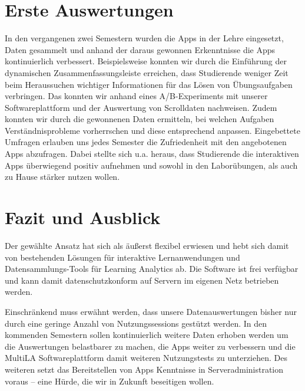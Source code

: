 \documentclass[a0,portrait]{a0poster}
\begin{document}
\begin{multicols}{2}


\section*{Erste Auswertungen}

In den vergangenen zwei Semestern wurden die Apps in der Lehre eingesetzt, Daten gesammelt und anhand der daraus gewonnen Erkenntnisse die Apps kontinuierlich verbessert. Beispielsweise konnten wir durch die Einführung der dynamischen Zusammenfassungsleiste erreichen, dass Studierende weniger Zeit beim Heraussuchen wichtiger Informationen für das Lösen von Übungsaufgaben verbringen. Das konnten wir anhand eines A/B-Experiments mit unserer Softwareplattform und der Auswertung von Scrolldaten nachweisen. Zudem konnten wir durch die gewonnenen Daten ermitteln, bei welchen Aufgaben Verständnisprobleme vorherrschen und diese entsprechend anpassen. Eingebettete Umfragen erlauben uns jedes Semester die Zufriedenheit mit den angebotenen Apps abzufragen. Dabei stellte sich u.a. heraus, dass Studierende die interaktiven Apps überwiegend positiv aufnehmen und sowohl in den Laborübungen, als auch zu Hause stärker nutzen wollen.

\section*{Fazit und Ausblick}

Der gewählte Ansatz hat sich als äußerst flexibel erwiesen und hebt sich damit von bestehenden Lösungen für interaktive Lernanwendungen und Datensammlungs-Tools für Learning Analytics ab. Die Software ist frei verfügbar und kann damit datenschutzkonform auf Servern im eigenen Netz betrieben werden.

Einschränkend muss erwähnt werden, dass unsere Datenauswertungen bisher nur durch eine geringe Anzahl von Nutzungssessions gestützt werden. In den kommenden Semestern sollen kontinuierlich weitere Daten erhoben werden um die Auswertungen belastbarer zu machen, die Apps weiter zu verbessern und die MultiLA Softwareplattform damit weiteren Nutzungstests zu unterziehen. Des weiteren setzt das Bereitstellen von Apps  Kenntnisse in Serveradministration voraus – eine Hürde, die wir in Zukunft beseitigen wollen.


\end{multicols}
\end{document}
